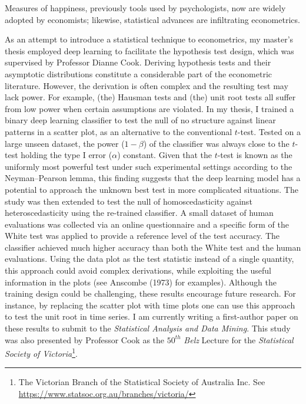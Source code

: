 \documentclass[12pt,]{article}
\let\rmarkdownfootnote\footnote%
\def\footnote{\protect\rmarkdownfootnote}
\begin{document}
Measures of happiness, previously tools used by psychologists, now are
widely adopted by economists; likewise, statistical advances are
infiltrating econometrics.

As an attempt to introduce a statistical technique to econometrics, my
master's thesis employed deep learning to facilitate the hypothesis test
design, which was supervised by Professor Dianne Cook. Deriving
hypothesis tests and their asymptotic distributions constitute a
considerable part of the econometric literature. However, the derivation
is often complex and the resulting test may lack power. For example,
(the) Hausman tests and (the) unit root tests all suffer from low power
when certain assumptions are violated. In my thesis, I trained a binary
deep learning classifier to test the null of no structure against linear
patterns in a scatter plot, as an alternative to the conventional
\(t\)-test. Tested on a large unseen dataset, the power (\(1-\beta\)) of
the classifier was always close to the \(t\)-test holding the type I
error (\(\alpha\)) constant. Given that the \(t\)-test is known as the
uniformly most powerful test under such experimental settings according
to the Neyman--Pearson lemma, this finding suggests that the deep
learning model has a potential to approach the unknown best test in more
complicated situations. The study was then extended to test the null of
homoscedasticity against heteroscedasticity using the re-trained
classifier. A small dataset of human evaluations was collected via an
online questionnaire and a specific form of the White test was applied
to provide a reference level of the test accuracy. The classifier
achieved much higher accuracy than both the White test and the human
evaluations. Using the data plot as the test statistic instead of a
single quantity, this approach could avoid complex derivations, while
exploiting the useful information in the plots (see Anscombe (1973) for
examples). Although the training design could be challenging, these
results encourage future research. For instance, by replacing the
scatter plot with time plots one can use this approach to test the unit
root in time series. I am currently writing a first-author paper on
these results to submit to the \emph{Statistical Analysis and Data
Mining}. This study was also presented by Professor Cook as the
\(50^{th}\) \emph{Belz} Lecture for the \emph{Statistical Society of
Victoria}\footnote{The Victorian Branch of the Statistical Society of
  Australia Inc. See \url{https://www.statsoc.org.au/branches/victoria/}}.
\end{document}
